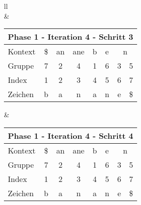 \begin{table}[H]
\begin{adjustbox}{max width=\textwidth}
\begin{tabular}{ll}
\\
&
\\

\begin{tabular}{lccccccc}
\multicolumn{8}{l}{Phase 1 - Iteration 4 - Schritt 3}                                                                                                                                                                          \\ \hline
\multicolumn{1}{l|}{Kontext} & \multicolumn{1}{c|}{\$} & \multicolumn{1}{c|}{an}   & \multicolumn{1}{c|}{\cellcolor[HTML]{\green}ane} & \multicolumn{1}{c|}{b}    & \multicolumn{1}{c|}{e}    & \multicolumn{2}{c}{n}         \\
\multicolumn{1}{l|}{Gruppe}  & \multicolumn{1}{c|}{7}  & \multicolumn{1}{c|}{2}    & \multicolumn{1}{c|}{\cellcolor[HTML]{\green}4}   & \multicolumn{1}{c|}{1}    & \multicolumn{1}{c|}{6}    & 3                         & 5  \\ \hline
\multicolumn{1}{l|}{Index}   & 1                       & \cellcolor[HTML]{\red}2 & \cellcolor[HTML]{\red}3                        & \cellcolor[HTML]{\green}4 & \cellcolor[HTML]{\green}5 & \cellcolor[HTML]{\green}6 & 7  \\
\multicolumn{1}{l|}{Zeichen} & b                       & \cellcolor[HTML]{\red}a & \cellcolor[HTML]{\red}n                        & \cellcolor[HTML]{\green}a & \cellcolor[HTML]{\green}n & \cellcolor[HTML]{\green}e & \$
\end{tabular}

&

\begin{tabular}{lccccccc}
\multicolumn{8}{l}{Phase 1 - Iteration 4 - Schritt 4}                                                                                                                                                                                                \\ \hline
\multicolumn{1}{l|}{Kontext} & \multicolumn{1}{c|}{\$} & \multicolumn{1}{c|}{\cellcolor[HTML]{\red}an} & \multicolumn{1}{c|}{\cellcolor[HTML]{\green}ane} & \multicolumn{1}{c|}{b}    & \multicolumn{1}{c|}{e}    & \multicolumn{2}{c}{n}         \\
\multicolumn{1}{l|}{Gruppe}  & \multicolumn{1}{c|}{7}  & \multicolumn{1}{c|}{\cellcolor[HTML]{\red}2}  & \multicolumn{1}{c|}{\cellcolor[HTML]{\green}4}   & \multicolumn{1}{c|}{1}    & \multicolumn{1}{c|}{6}    & 3                         & 5  \\ \hline
\multicolumn{1}{l|}{Index}   & 1                       & \cellcolor[HTML]{\red}2                       & \cellcolor[HTML]{\red}3                        & \cellcolor[HTML]{\green}4 & \cellcolor[HTML]{\green}5 & \cellcolor[HTML]{\green}6 & 7  \\
\multicolumn{1}{l|}{Zeichen} & b                       & \cellcolor[HTML]{\red}a                       & \cellcolor[HTML]{\red}n                        & \cellcolor[HTML]{\green}a & \cellcolor[HTML]{\green}n & \cellcolor[HTML]{\green}e & \$
\end{tabular}


\end{tabular}
\end{adjustbox}
\end{table}
